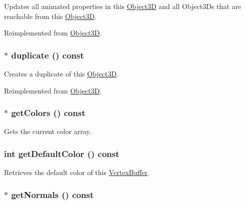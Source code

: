 Updates all animated properties in this \hyperlink{classm3g_1_1Object3D}{Object3D} and all Object3Ds that are reachable from this \hyperlink{classm3g_1_1Object3D}{Object3D}. 

Reimplemented from \hyperlink{classm3g_1_1Object3D_8aad1ceab4c2a03609c8a42324ce484d}{Object3D}.\hypertarget{classm3g_1_1VertexBuffer_d069984e7455bfe074cab9497b47cadf}{
\subsubsection[{duplicate}]{ $\ast$ duplicate () const}}
\label{classm3g_1_1VertexBuffer_d069984e7455bfe074cab9497b47cadf}


Creates a duplicate of this \hyperlink{classm3g_1_1Object3D}{Object3D}. 

Reimplemented from \hyperlink{classm3g_1_1Object3D_a25110dac934f867b83b73ad4741a0f4}{Object3D}.\hypertarget{classm3g_1_1VertexBuffer_e3bdc8503242a6d278230352d03e5893}{
\subsubsection[{getColors}]{ $\ast$ getColors () const}}
\label{classm3g_1_1VertexBuffer_e3bdc8503242a6d278230352d03e5893}


Gets the current color array. \hypertarget{classm3g_1_1VertexBuffer_4e33b93a98ce0632d51e7ae775ae5b1e}{
\subsubsection[{getDefaultColor}]{\setlength{\rightskip}{0pt plus 5cm}int getDefaultColor () const}}
\label{classm3g_1_1VertexBuffer_4e33b93a98ce0632d51e7ae775ae5b1e}


Retrieves the default color of this \hyperlink{classm3g_1_1VertexBuffer}{VertexBuffer}. \hypertarget{classm3g_1_1VertexBuffer_0f4341d1215ff8f4efeaa40a21327c0c}{
\subsubsection[{getNormals}]{ $\ast$ getNormals () const}}
\label{classm3g_1_1VertexBuffer_0f4341d1215ff8f4efeaa40a21327c0c}


